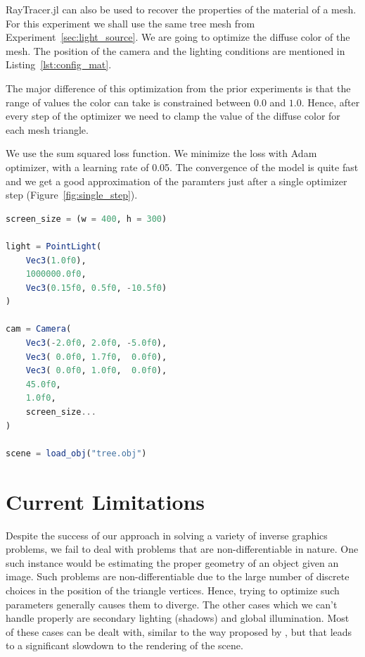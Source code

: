 \documentclass{juliacon}
\begin{document}
RayTracer.jl can also be used to recover the properties of the material of a mesh. For this experiment we shall use the same tree mesh from Experiment~\ref{sec:light_source}. We are going to optimize the diffuse color of the mesh. The position of the camera and the lighting conditions are mentioned in Listing~\ref{lst:config_mat}.

The major difference of this optimization from the prior experiments is that the range of values the color can take is constrained between $0.0$ and $1.0$. Hence, after every step of the optimizer we need to clamp the value of the diffuse color for each mesh triangle.

We use the sum squared loss function. We minimize the loss with Adam optimizer, with a learning rate of 0.05. The convergence of the model is quite fast and we get a good approximation of the paramters just after a single optimizer step (Figure~\ref{fig:single_step}).

\noindent
\begin{minipage}{\linewidth}
\begin{lstlisting}[caption = {Configuration of the Scene for Experiment~\ref{sec:mat_color}},
                   label = {lst:config_mat},
                   captionpos = b,
                   language = Julia]
screen_size = (w = 400, h = 300)

light = PointLight(
    Vec3(1.0f0),
    1000000.0f0,
    Vec3(0.15f0, 0.5f0, -10.5f0)
)

cam = Camera(
    Vec3(-2.0f0, 2.0f0, -5.0f0),
    Vec3( 0.0f0, 1.7f0,  0.0f0),
    Vec3( 0.0f0, 1.0f0,  0.0f0),
    45.0f0,
    1.0f0,
    screen_size...
)

scene = load_obj("tree.obj")
\end{lstlisting}
\end{minipage}


\section{Current Limitations}

Despite the success of our approach in solving a variety of inverse graphics problems, we fail to deal with problems that are non-differentiable in nature. One such instance would be estimating the proper geometry of an object given an image. Such problems are non-differentiable due to the large number of discrete choices in the position of the triangle vertices. Hence, trying to optimize such parameters generally causes them to diverge. The other cases which we can't handle properly are secondary lighting (shadows) and global illumination. Most of these cases can be dealt with, similar to the way proposed by \cite{Li:2018:DMC}, but that leads to a significant slowdown to the rendering of the scene. 
\end{document}

